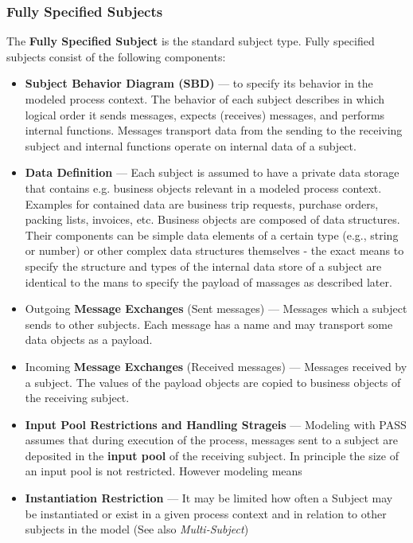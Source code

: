 \subsubsection{Fully Specified Subjects}

The \textbf{Fully Specified Subject} is the standard subject type. Fully specified subjects consist of the following components:

\begin{itemize}
    \item \textbf{Subject Behavior Diagram (SBD)} --- to specify its behavior in the modeled process context. The behavior of each subject describes in which logical order it sends messages, expects (receives) messages, and performs internal functions. Messages transport data from the sending to the receiving subject and internal functions operate on internal data of a subject. 
	\item \textbf{Data Definition} --- Each subject is assumed to have a private data storage that contains e.g. business objects relevant in a modeled process context. Examples for contained data are business trip requests, purchase orders, packing lists, invoices, etc. Business objects are composed of data structures. Their components can be simple data elements of a certain type (e.g., string or number) or other complex data structures themselves - the exact means to specify the structure and types of the internal data store of a subject are identical to the mans to specify the payload of massages as described later.
	\item Outgoing \textbf{Message Exchanges} (Sent messages) --- Messages which a subject sends to other subjects. Each message has a name and may transport some data objects as a payload.
	\item Incoming \textbf{Message Exchanges} (Received messages) --- Messages received by a subject. The values of the payload objects are copied to business objects of the receiving subject.
	\item \textbf{Input Pool Restrictions and Handling Strageis} --- Modeling with PASS assumes that during execution of the process, messages sent to a subject are deposited in the \textbf{input pool} of the receiving subject. In principle the size of an input pool is not restricted. However modeling means 
	\item \textbf{Instantiation Restriction}  --- It may be limited how often a Subject may be instantiated or exist in a given process context and in relation to other subjects in the model (See also \textit{Multi-Subject})
\end{itemize}

